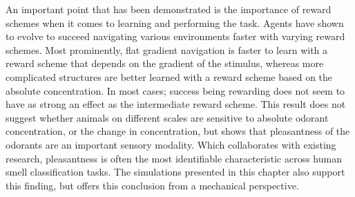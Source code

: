 \documentclass[../dissertation.tex]{subfiles}
\begin{document}
An important point that has been demonstrated is the importance of reward schemes when it comes to learning and performing the task.
Agents have shown to evolve to succeed navigating various environments faster with varying reward schemes.
Most prominently, flat gradient navigation is faster to learn with a reward scheme that depends on the gradient of the stimulus, whereas more complicated structures are better learned with a reward scheme based on the absolute concentration.
In most cases; success being rewarding does not seem to have as strong an effect as the intermediate reward scheme.
This result does not suggest whether animals on different scales are sensitive to absolute odorant concentration, or the change in concentration, but shows that pleasantness of the odorants are an important sensory modality.
Which collaborates with existing research, pleasantness is often the most identifiable characteristic across human smell classification tasks.
The simulations presented in this chapter also support this finding, but offers this conclusion from a mechanical perspective.
\end{document}
